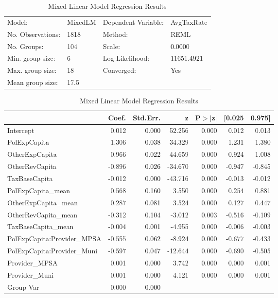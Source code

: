 \begin{table}[H]
\caption{Mixed Linear Model Regression Results}
\label{}
\begin{center}
\begin{tabular}{llll}
\hline
Model:            & MixedLM & Dependent Variable: & AvgTaxRate  \\
No. Observations: & 1818    & Method:             & REML        \\
No. Groups:       & 104     & Scale:              & 0.0000      \\
Min. group size:  & 6       & Log-Likelihood:     & 11651.4921  \\
Max. group size:  & 18      & Converged:          & Yes         \\
Mean group size:  & 17.5    &                     &             \\
\hline
\end{tabular}
\end{center}

\begin{center}
\begin{tabular}{lrrrrrr}
\hline
                            &  Coef. & Std.Err. &       z & P$> |$z$|$ & [0.025 & 0.975]  \\
\hline
Intercept                   &  0.012 &    0.000 &  52.256 &       0.000 &  0.012 &  0.013  \\
PolExpCapita                &  1.306 &    0.038 &  34.329 &       0.000 &  1.231 &  1.380  \\
OtherExpCapita              &  0.966 &    0.022 &  44.659 &       0.000 &  0.924 &  1.008  \\
OtherRevCapita              & -0.896 &    0.026 & -34.670 &       0.000 & -0.947 & -0.845  \\
TaxBaseCapita               & -0.012 &    0.000 & -43.716 &       0.000 & -0.013 & -0.012  \\
PolExpCapita\_mean          &  0.568 &    0.160 &   3.550 &       0.000 &  0.254 &  0.881  \\
OtherExpCapita\_mean        &  0.287 &    0.081 &   3.524 &       0.000 &  0.127 &  0.447  \\
OtherRevCapita\_mean        & -0.312 &    0.104 &  -3.012 &       0.003 & -0.516 & -0.109  \\
TaxBaseCapita\_mean         & -0.004 &    0.001 &  -4.955 &       0.000 & -0.006 & -0.003  \\
PolExpCapita:Provider\_MPSA & -0.555 &    0.062 &  -8.924 &       0.000 & -0.677 & -0.433  \\
PolExpCapita:Provider\_Muni & -0.597 &    0.047 & -12.644 &       0.000 & -0.690 & -0.505  \\
Provider\_MPSA              &  0.001 &    0.000 &   3.742 &       0.000 &  0.000 &  0.001  \\
Provider\_Muni              &  0.001 &    0.000 &   4.121 &       0.000 &  0.000 &  0.001  \\
Group Var                   &  0.000 &    0.000 &         &             &        &         \\
\hline
\end{tabular}
\end{center}
\end{table}
\bigskip
